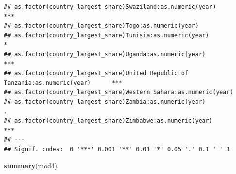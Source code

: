 \documentclass[
  a4paper,
]{article}
\newenvironment{Shaded}{\begin{snugshade}}{\end{snugshade}}
\newcommand{\FunctionTok}[1]{\textcolor[rgb]{0.13,0.29,0.53}{\textbf{#1}}}
\newcommand{\NormalTok}[1]{#1}
\begin{document}
\begin{verbatim}
## as.factor(country_largest_share)Swaziland:as.numeric(year)                        ***
## as.factor(country_largest_share)Togo:as.numeric(year)                                
## as.factor(country_largest_share)Tunisia:as.numeric(year)                          *  
## as.factor(country_largest_share)Uganda:as.numeric(year)                           ***
## as.factor(country_largest_share)United Republic of Tanzania:as.numeric(year)      ***
## as.factor(country_largest_share)Western Sahara:as.numeric(year)                      
## as.factor(country_largest_share)Zambia:as.numeric(year)                           .  
## as.factor(country_largest_share)Zimbabwe:as.numeric(year)                         ***
## ---
## Signif. codes:  0 '***' 0.001 '**' 0.01 '*' 0.05 '.' 0.1 ' ' 1
\end{verbatim}

\begin{Shaded}
\begin{Highlighting}[]
\FunctionTok{summary}\NormalTok{(mod4)}
\end{Highlighting}
\end{Shaded}
\end{document}
